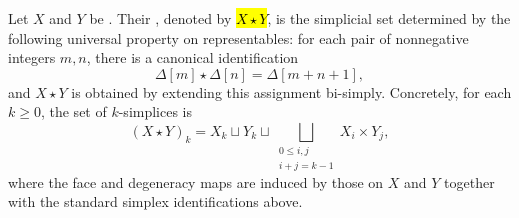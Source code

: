 \begin{definition} \label{definition:join_of_simplicial_sets}
Let $X$ and $Y$ be . Their , denoted by \hl{$X \star Y$}, is the simplicial set determined by the following universal property on representables: for each pair of nonnegative integers $m, n$, there is a canonical identification
$$\Delta[m] \star \Delta[n] = \Delta[m+n+1],$$
and $X \star Y$ is obtained by extending this assignment bi-simply. Concretely, for each $k \ge 0$, the set of $k$-simplices is
$$(X \star Y)_k = X_k \sqcup Y_k \sqcup \bigsqcup_{\substack{0 \le i,j \\ i+j = k-1}} X_i \times Y_j,$$
where the face and degeneracy maps are induced by those on $X$ and $Y$ together with the standard simplex identifications above.
\end{definition}
